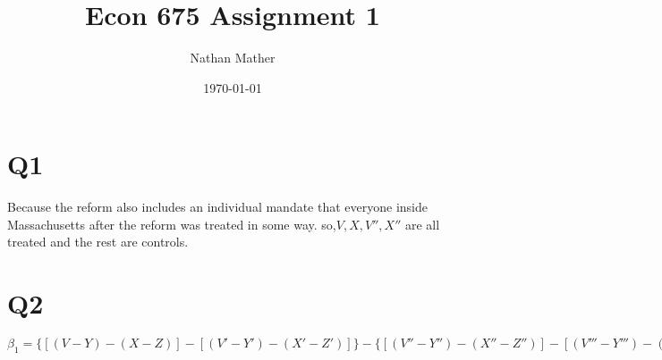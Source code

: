 \documentclass[11pt]{article}
\title{Econ 675 Assignment 1} %
\author{Nathan Mather} %
\date{\today} %
\begin{document}
	
\maketitle %

\setcounter{tocdepth}{2} %

\tableofcontents %


\section{Q1}

Because the reform also includes an individual mandate that everyone inside Massachusetts after the reform was treated in some way. so,$ V, X, V'',X''$ are all treated and the rest are controls. 


\section{Q2}

$\beta_1 = \{[(V-Y) - (X-Z)] - [(V'-Y') - (X'-Z')]\} - \{[(V'' - Y'') - (X''-Z'')] - [(V'''-Y''')-(X'''-Z''')]\}$


\end{document}
